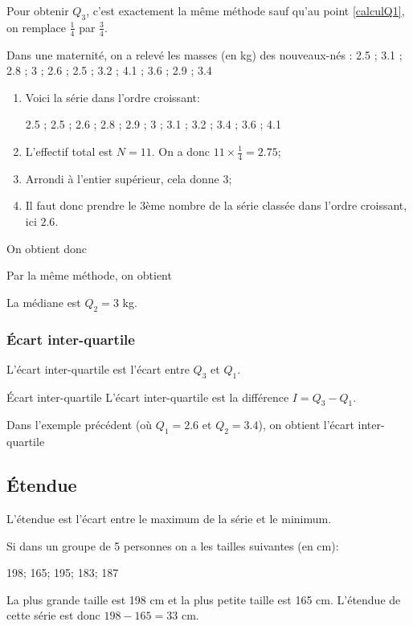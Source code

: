 \documentclass[a4paper,12pt]{scrartcl}
\begin{document}
Pour obtenir $Q_3$, c'est exactement la même méthode sauf qu'au point \ref{calculQ1}, on remplace $\frac{1}{4}$ par $\frac{3}{4}$.

\exemple{}
Dans une maternité, on a relevé les masses (en kg) des nouveaux-nés :
2.5 ; 3.1 ; 2.8 ; 3 ; 2.6 ; 2.5 ; 3.2 ; 4.1 ; 3.6 ; 2.9 ; 3.4

\begin{enumerate}
\item Voici la série dans l'ordre croissant: 

2.5 ; 2.5 ; 2.6 ; 2.8 ; 2.9 ; 3 ; 3.1 ; 3.2 ; 3.4 ; 3.6 ; 4.1
\item L'effectif total est $N = 11$. On a donc $11 \times \frac{1}{4} = 2.75$;
\item Arrondi à l'entier supérieur, cela donne 3;
\item Il faut donc prendre le 3ème nombre de la série classée dans l'ordre croissant, ici $2.6$. 
\end{enumerate}

On obtient donc 

Par la même méthode, on obtient 

La médiane est $Q_2 = 3$ kg. 

\subsubsection{Écart inter-quartile}

L'écart inter-quartile est l'écart entre $Q_3$ et $Q_1$.

\begin{definition}{Écart inter-quartile}
L'écart inter-quartile est la différence $I = Q_3 - Q_1$.
\end{definition}

\exemple{}
Dans l'exemple précédent (où $Q_1 = 2.6$ et $Q_2 = 3.4$), on obtient l'écart inter-quartile 

\subsection{Étendue}

L'étendue est l'écart entre le maximum de la série et le minimum. 

Si dans un groupe de 5 personnes on a les tailles suivantes (en cm):

198; 165; 195; 183; 187

La plus grande taille est 198 cm et la plus petite taille est 165 cm. L'étendue de cette série est donc $198-165 = 33 \mbox{ cm}$.




%
\end{document}
